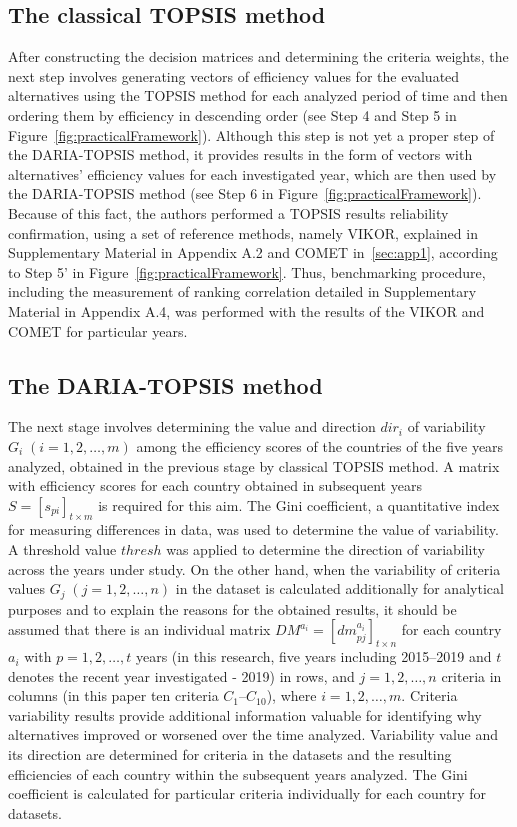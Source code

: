 \documentclass[final,5p,times,twocolumn,authoryear]{elsarticle}
\begin{document}
\subsection{The classical TOPSIS method}
After constructing the decision matrices and determining the criteria weights, the next step involves generating vectors of efficiency values for the evaluated alternatives using the TOPSIS method for each analyzed period of time and then ordering them by efficiency in descending order (see Step 4 and Step 5 in Figure~\ref{fig:practicalFramework}). Although this step is not yet a proper step of the DARIA-TOPSIS method, it provides results in the form of vectors with alternatives' efficiency values for each investigated year, which are then used by the DARIA-TOPSIS method (see Step 6 in Figure~\ref{fig:practicalFramework}). Because of this fact, the authors performed a TOPSIS results reliability confirmation, using a set of reference methods, namely VIKOR, explained in Supplementary Material in Appendix A.2 and COMET in~\ref{sec:app1}, according to Step 5' in Figure~\ref{fig:practicalFramework}. Thus, benchmarking procedure, including the measurement of ranking correlation detailed in Supplementary Material in Appendix A.4, was performed with the results of the VIKOR and COMET for particular years.

\subsection{The DARIA-TOPSIS method}
The next stage involves determining the value and direction $dir_{i}$ of variability $G_{i} \; (i = 1, 2, \ldots, m)$ among the efficiency scores of the countries of the five years analyzed, obtained in the previous stage by classical TOPSIS method. A matrix with efficiency scores for each country obtained in subsequent years $S = [s_{pi}]_{t \times m}$ is required for this aim. The Gini coefficient, a quantitative index for measuring differences in data, was used to determine the value of variability. A threshold value $thresh$ was applied to determine the direction of variability across the years under study.
%
On the other hand, when the variability of criteria values $G_{j} \; (j = 1, 2, \ldots, n)$ in the dataset is calculated additionally for analytical purposes and to explain the reasons for the obtained results, it should be assumed that there is an individual matrix $DM^{a_{i}} = [dm^{a_{i}}_{pj}]_{t \times n}$ for each country $a_{i}$ with $p = 1, 2, \ldots, t$ years (in this research, five years including 2015--2019 and $t$ denotes the recent year investigated - 2019) in rows, and $j = 1, 2, \ldots, n$ criteria in columns (in this paper ten criteria $C_1$--$C_{10}$), where $i = 1, 2, \ldots, m$. Criteria variability results provide additional information valuable for identifying why alternatives improved or worsened over the time analyzed.
%
Variability value and its direction are determined for criteria in the datasets and the resulting efficiencies of each country within the subsequent years analyzed. The Gini coefficient is calculated for particular criteria individually for each country for datasets.
\end{document}
